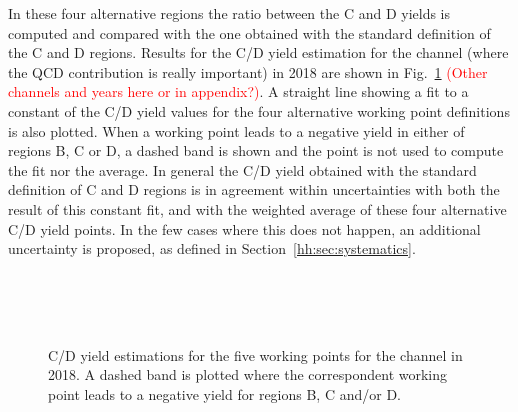 \documentclass[../main.tex]{subfiles}
\begin{document}
In these four alternative regions the ratio between the C and D yields is computed and compared with the one obtained with the standard definition of the C and D regions. Results for the C/D yield estimation for the \tauh\tauh{} channel (where the QCD contribution is really important) in 2018 are shown in Fig.~\ref{hh:fig:qcd_test1} \textcolor{red}{(Other channels and years here or in appendix?)}. A straight line showing a fit to a constant of the C/D yield values for the four alternative working point definitions is also plotted. When a working point leads to a negative yield in either of regions B, C or D, a dashed band is shown and the point is not used to compute the fit nor the average. In general the C/D yield obtained with the standard definition of C and D regions is in agreement within uncertainties with both the result of this constant fit, and with the weighted average of these four alternative C/D yield points. In the few cases where this does not happen, an additional uncertainty is proposed, as defined in Section~\ref{hh:sec:systematics}.

\begin{figure}[h!]
\begin{center}
\\
\\
\\
\end{center}
\caption{C/D yield estimations for the five working points for the \tauh\tauh{} channel in 2018. A dashed band is plotted where the correspondent working point leads to a negative yield for regions B, C and/or D.}
\label{hh:fig:qcd_test1}
\end{figure}
\end{document}
